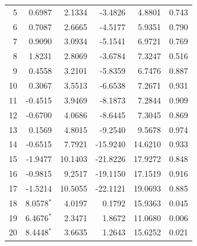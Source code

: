 \begin{longtable}{rrrrrr}
5 & 0.6987 & 2.1334 & -3.4826 & 4.8801 & 0.743 \\
6 & 0.7087 & 2.6665 & -4.5177 & 5.9351 & 0.790 \\
7 & 0.9090 & 3.0934 & -5.1541 & 6.9721 & 0.769 \\
8 & 1.8231 & 2.8069 & -3.6784 & 7.3247 & 0.516 \\
9 & 0.4558 & 3.2101 & -5.8359 & 6.7476 & 0.887 \\
10 & 0.3067 & 3.5513 & -6.6538 & 7.2671 & 0.931 \\
11 & -0.4515 & 3.9469 & -8.1873 & 7.2844 & 0.909 \\
12 & -0.6700 & 4.0686 & -8.6445 & 7.3045 & 0.869 \\
13 & 0.1569 & 4.8015 & -9.2540 & 9.5678 & 0.974 \\
14 & -0.6515 & 7.7921 & -15.9240 & 14.6210 & 0.933 \\
15 & -1.9477 & 10.1403 & -21.8226 & 17.9272 & 0.848 \\
16 & -0.9815 & 9.2517 & -19.1150 & 17.1519 & 0.916 \\
17 & -1.5214 & 10.5055 & -22.1121 & 19.0693 & 0.885 \\
18 & 8.0578$^{*}$ & 4.0197 & 0.1792 & 15.9363 & 0.045 \\
19 & 6.4676$^{*}$ & 2.3471 & 1.8672 & 11.0680 & 0.006 \\
20 & 8.4448$^{*}$ & 3.6635 & 1.2643 & 15.6252 & 0.021 \\
\end{longtable}
